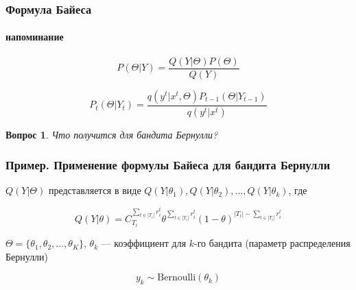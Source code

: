\documentclass[fullscreen=true, bookmarks=true, hyperref={pdfencoding=unicode}]{beamer}
\newtheorem*{question}{Вопрос}
\begin{document}
\begin{frame}
  \frametitle{Формула Байеса}
  \framesubtitle{напоминание}

  $$ P(\Theta|Y) = \frac{Q(Y|\Theta)P(\Theta)}{Q(Y)}$$

  \pause
  $$ P_t(\Theta|Y_t) = \frac{q(y^t|x^t, \Theta) P_{t-1}(\Theta|Y_{t-1})}{q(y^t|x^t)}$$

  \pause
  \begin{question}
    Что получится для бандита Бернулли?
  \end{question}
\end{frame}


\begin{frame}
  \frametitle{Пример. Применение формулы Байеса для бандита Бернулли}

  $Q(Y|\Theta)$ представляется в виде $Q(Y|\theta_1), Q(Y|\theta_2),\dots,Q(Y|\theta_k)$, где

  $$ Q(Y|\theta) = C_{T_i}^{\sum\limits_{t \in |T_i|} r_i^t}
  \theta^{\sum\limits_{t \in |T_i|} r_i^t} (1-\theta)^{|T_i| - \sum\limits_{t \in |T_i|}r_i^t}
  $$

  $ \Theta = \{\theta_1, \theta_2, \dots, \theta_K\} $, $\theta_k$ — коэффициент для $k$-го бандита (параметр распределения Бернулли)

  $$y_k \sim \text{Bernoulli}(\theta_k)$$

\end{frame}
\end{document}
